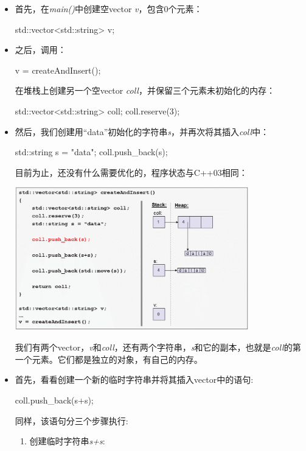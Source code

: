 \begin{itemize}
	\item 首先，在\textit{main()}中创建空vector \textit{v}，包含0个元素：
	\begin{cppcode}
std::vector<std::string> v;
	\end{cppcode}
	\item 之后，调用：
\begin{cppcode}
v = createAndInsert();
\end{cppcode}
	在堆栈上创建另一个空vector \textit{coll}，并保留三个元素未初始化的内存：
\begin{cppcode}
std::vector<std::string> coll;
coll.reserve(3);
\end{cppcode}
	\item 然后，我们创建用“data”初始化的字符串\textit{s}，并再次将其插入\textit{coll}中：
\begin{cppcode}
std::string s = "data";
coll.push_back(s);
\end{cppcode}
	目前为止，还没有什么需要优化的，程序状态与C++03相同：
\begin{center}
		\includegraphics[width=0.8\textwidth]{part1/ch1/images/10}
	\end{center}
	我们有两个vector，\textit{v}和\textit{coll}，还有两个字符串，\textit{s}和它的副本，也就是\textit{coll}的第一个元素。它们都是独立的对象，有自己的内存。

	\item 首先，看看创建一个新的临时字符串并将其插入vector中的语句:
\begin{cppcode}
coll.push_back(s+s);
\end{cppcode}
	同样，该语句分三个步骤执行:

	\begin{enumerate}
		\item 创建临时字符串\textit{s+s}:


\end{enumerate}
\end{itemize}
